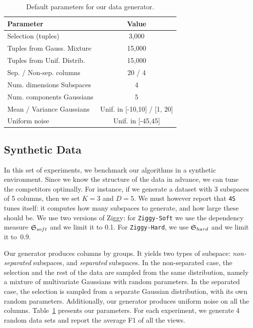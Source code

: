 \begin{table}[t!]
    \centering
    \small
    \begin{tabularx}{\columnwidth}{X  c }
      \hline
      Parameter & Value\\
      \hline
      Selection (tuples) & 3,000\\
      Tuples from Gauss. Mixture & 15,000\\ 
      Tuples from Unif. Distrib. & 15,000\\
      Sep. / Non-sep. columns & 20 / 4\\
      \hline
      Num. dimensions Subspaces & 4\\
      Num. components Gaussians& 5\\
      Mean / Variance Gaussians & Unif. in [-10,10] / [1, 20]\\
      Uniform noise & Unif. in [-45,45]\\
      \hline
    \end{tabularx}
    \caption{Default parameters for our data generator.} 
\label{tab:synthparameters}
\end{table}

\subsection{Synthetic Data}
\label{sec:synthexp}


In this set of experiments, we benchmark our algorithms in a synthetic
environment. Since we know the structure of the data in advance, we can tune
the competitors optimally. For instance, if we generate a dataset with 3
subspaces of 5 columns, then we set $K=3$ and $D=5$. We must however report
that \texttt{4S} tunes itself: it computes how many subspaces to generate, and
how large these should be. We use two versions of Ziggy: for
\texttt{Ziggy-Soft} we use the dependency measure $\mathfrak{S}_{soft}$ and we limit
it to 0.1. For \texttt{Ziggy-Hard}, we use $\mathfrak{S}_{hard}$ and we limit it
to~0.9.

Our generator produces columns by groups. It
yields two types of subspace: \emph{non-separated} subspaces, and
\emph{separated} subspaces. In the non-separated case, the selection and the
rest of the data are sampled from the same distribution, namely a mixture of
multivariate Gaussians with random parameters. In the separated case, the
selection is sampled from a separate Gaussian distribution, with its own random
parameters. Additionally, our generator produces uniform noise on all the
columns. Table~\ref{tab:synthparameters} presents our parameters. For each
experiment, we generate 4 random data sets and report the average F1 of all the
views.

